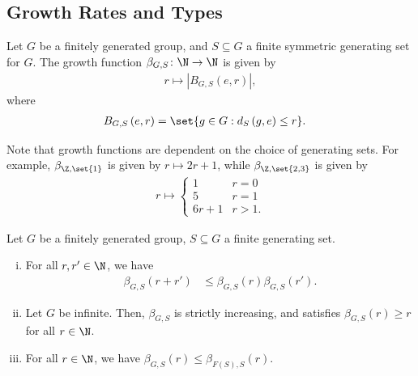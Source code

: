 \documentclass[10pt]{mypackage}
\begin{document}
\subsection{Growth Rates and Types}%
\begin{definition}
  Let $G$ be a finitely generated group, and $S\subseteq G$ a finite symmetric generating set for $G$. The growth function $\beta_{G,S}\colon \N\rightarrow \N$ is given by
  \begin{align*}
    r\mapsto \left\vert B_{G,S} \left( e,r \right) \right\vert,
  \end{align*}
  where
  \begin{align*}
    B_{G,S}\left( e,r \right) &= \set{g\in G : d_S\left( g,e \right) \leq r}.
  \end{align*}
\end{definition}
Note that growth functions are dependent on the choice of generating sets. For example, $\beta_{\Z,\set{1}}$ is given by $r\mapsto 2r+1$, while $\beta_{\Z,\set{2,3}}$ is given by
\begin{align*}
  r \mapsto \begin{cases}
    1 & r= 0\\
    5 & r=1\\
    6r+1 & r > 1.
  \end{cases}
\end{align*}
\begin{lemma}
  Let $G$ be a finitely generated group, $S\subseteq G$ a finite generating set.
  \begin{enumerate}[(i)]
    \item For all $r,r'\in \N$, we have
      \begin{align*}
        \beta_{G,S} \left( r + r' \right) &\leq \beta_{G,S}\left( r \right)\beta_{G,S}\left( r' \right).
      \end{align*}
    \item Let $G$ be infinite. Then, $\beta_{G,S}$ is strictly increasing, and satisfies $\beta_{G,S}(r) \geq r$ for all $r\in \N$.
    \item For all $r\in \N$, we have $\beta_{G,S}\left( r \right) \leq \beta_{F(S),S}\left( r \right)$.
  \end{enumerate}
\end{lemma}
\end{document}
